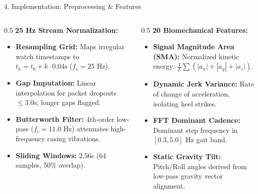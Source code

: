 \documentclass[aspectratio=169]{beamer}
\begin{document}
\begin{frame}{4. Implementation: Preprocessing \& Features}
\begin{columns}
\begin{column}{0.5\textwidth}
\textbf{25 Hz Stream Normalization:}
\begin{itemize}
    \item \textbf{Resampling Grid:} Maps irregular watch timestamps to $t_k = t_0 + k \cdot 0.04\text{s}$ ($f_s = 25\text{ Hz}$).
    \item \textbf{Gap Imputation:} Linear interpolation for packet dropouts $\le 3.0\text{s}$; longer gaps flagged.
    \item \textbf{Butterworth Filter:} 4th-order low-pass ($f_c = 11.0\text{ Hz}$) attenuates high-frequency casing vibrations.
    \item \textbf{Sliding Windows:} 2.56s (64 samples, 50\% overlap).
\end{itemize}
\end{column}
\begin{column}{0.5\textwidth}
\textbf{20 Biomechanical Features:}
\begin{itemize}
    \item \textbf{Signal Magnitude Area (SMA):} Normalized kinetic energy: $\frac{1}{L} \sum (|a_x| + |a_y| + |a_z|)$.
    \item \textbf{Dynamic Jerk Variance:} Rate of change of acceleration, isolating heel strikes.
    \item \textbf{FFT Dominant Cadence:} Dominant step frequency in $[0.3, 5.0]\text{ Hz}$ gait band.
    \item \textbf{Static Gravity Tilt:} Pitch/Roll angles derived from low-pass gravity vector alignment.
\end{itemize}
\end{column}
\end{columns}
\end{frame}
\end{document}

